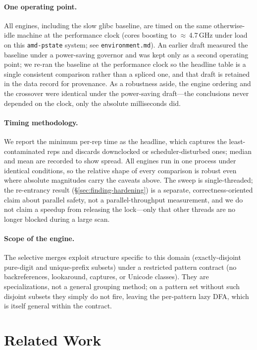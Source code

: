 \documentclass[acmsmall,nonacm,screen]{acmart}
\begin{document}
\paragraph{One operating point.} All engines, including the slow glibc baseline,
are timed on the same otherwise-idle machine at the performance clock (cores
boosting to $\approx$\,4.7\,GHz under load on this \texttt{amd-pstate} system; see
\texttt{environment.md}). An earlier draft measured the baseline under a power-saving
governor and was kept only as a second operating point; we re-ran the baseline at the
performance clock so the headline table is a single consistent comparison rather than
a spliced one, and that draft is retained in the data record for provenance. As a
robustness aside, the engine ordering and the crossover were identical under the
power-saving draft---the conclusions never depended on the clock, only the absolute
milliseconds did.

\paragraph{Timing methodology.} We report the minimum per-rep time as the headline,
which captures the least-contaminated reps and discards downclocked or
scheduler-disturbed ones; median and mean are recorded to show spread. All engines
run in one process under identical conditions, so the relative shape of every
comparison is robust even where absolute magnitudes carry the caveats above. The
sweep is single-threaded; the re-entrancy result (\S\ref{sec:finding-hardening}) is a
separate, correctness-oriented claim about parallel safety, not a parallel-throughput
measurement, and we do not claim a speedup from releasing the lock---only that other
threads are no longer blocked during a large scan.

\paragraph{Scope of the engine.} The selective merges exploit structure specific to
this domain (exactly-disjoint pure-digit and unique-prefix subsets) under a
restricted pattern contract (no backreferences, lookaround, captures, or Unicode
classes). They are specializations, not a general grouping method; on a pattern set
without such disjoint subsets they simply do not fire, leaving the per-pattern lazy
DFA, which is itself general within the contract.

\section{Related Work}
\label{sec:related}
\end{document}
